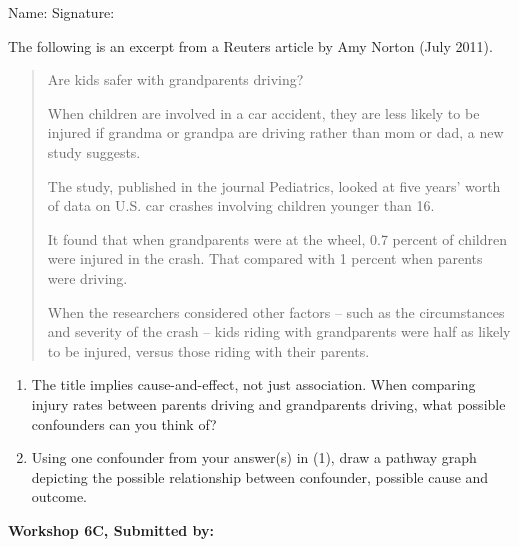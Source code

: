 \documentclass[11pt, chapterprefix=true]{scrbook}\usepackage[]{graphicx}\usepackage[]{color}
\begin{document}
\begin{exercises}
\begin{exercise}
\begin{center}
{{\vspace{4mm}
Name: \underline{\phantom{xxxxxxxxxxxxxxxxxxxxxxxx}} Signature: \underline{\phantom{xxxxxxxxxxxxxxxxxxxxxxxx}}
 }}
\end{center}

The following is an excerpt from a Reuters article by Amy Norton (July 2011).

\begin{quotation}

Are kids safer with grandparents driving?

When children are involved in a car accident, they are less likely to be injured if grandma or grandpa are driving rather than mom or dad, a new study suggests.

The study, published in the journal Pediatrics, looked at five years' worth of data on U.S. car crashes involving children younger than 16.

It found that when grandparents were at the wheel, 0.7 percent of children were injured in the crash. That compared with 1 percent when parents were driving.

When the researchers considered other factors -- such as the circumstances and severity of the crash -- kids riding with grandparents were half as likely to be injured, versus those riding with their parents.

\end{quotation}

\begin{enumerate}
  \item The title implies cause-and-effect, not just association.  When comparing injury rates between parents driving and grandparents driving, what possible    confounders can you think of?
  \item Using one confounder from your answer(s) in (1), draw a pathway graph depicting the possible relationship between confounder, possible cause and outcome.
\end{enumerate}
\end{exercise}
\begin{solution}  %

\end{solution}

\clearpage

    \begin{exercise}  %

    \begin{center}
\begin{flushleft}\textbf{\large \hfill Workshop 6C, Submitted by: }\end{flushleft}


\end{center}
\end{exercise}
\end{exercises}
\end{document}
